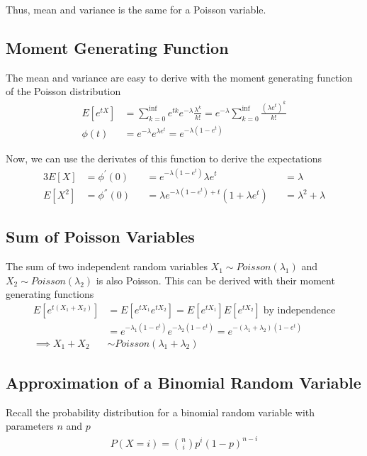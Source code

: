 \documentclass[../../probability-notes.tex]{subfiles}
\begin{document}
    Thus, mean and variance is the same for a Poisson variable.

    \subsection{Moment Generating Function}
    The mean and variance are easy to derive with the moment generating function of the Poisson distribution
    \begin{align*}
        E[e^{tX}] &= \sum_{k=0}^{\inf} e^{tk} e^{-\lambda} \frac{\lambda^{k}}{k!} = e^{-\lambda} \sum_{k=0}^{\inf} \frac{(\lambda e^{t})^{k}}{k!}\\
        \phi(t) &= e^{-\lambda} e^{\lambda e^{t}} = e^{-\lambda(1-e^{t})}
    \end{align*}

    Now, we can use the derivates of this function to derive the expectations
    \begin{alignat*}{3}
        E[X] &= \phi^{'}(0) &&= e^{-\lambda(1-e^{t})} \lambda e^{t} &&= \lambda\\
        E[X^{2}] &= \phi^{''}(0) &&= \lambda e^{-\lambda(1-e^{t}) + t} (1+\lambda e^{t}) &&= \lambda^{2} + \lambda
    \end{alignat*}

    \subsection{Sum of Poisson Variables}
    The sum of two independent random variables $X_{1} \sim Poisson(\lambda_{1})$ and $X_{2} \sim Poisson(\lambda_{2})$ is also Poisson. This can be derived with their moment generating functions
    \begin{align*}
        E[e^{t(X_{1} + X_{2})}] &= E[e^{tX_{1}} e^{tX_{2}}] = E[e^{tX_{1}}]E[e^{tX_{2}}] \;\text{by independence}\\
        &= e^{-\lambda_{1}(1-e^{t})} e^{-\lambda_{2}(1-e^{t})} = e^{-(\lambda_{1} + \lambda_{2})(1-e^{t})}\\
        \implies X_{1} + X_{2} &\sim Poisson(\lambda_{1} + \lambda_{2})
    \end{align*}

    \subsection{Approximation of a Binomial Random Variable}
    Recall the probability distribution for a binomial random variable with parameters $n$ and $p$
    \begin{align*}
        P(X = i) = \binom{n}{i} p^{i} (1-p)^{n-i}
    \end{align*}
\end{document}
